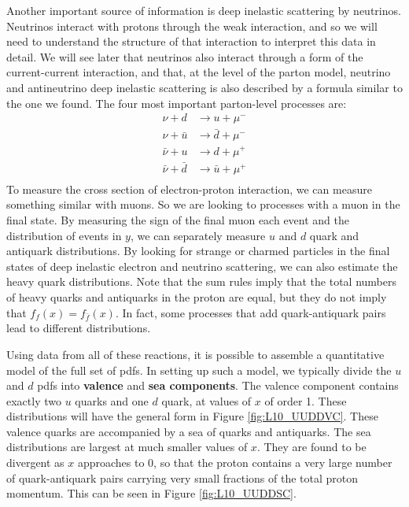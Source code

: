 \documentclass[../../main/main.tex]{subfiles}
\begin{document}
Another important source of information is deep inelastic scattering by neutrinos. Neutrinos interact with protons through the weak interaction, and so we will need to understand the structure of that interaction to interpret this data in detail. We will see later that neutrinos also interact through a form of the current-current interaction, and that, at the level of the parton model, neutrino and antineutrino deep inelastic scattering is also described by a formula similar to the one we found. The four most important parton-level processes are:
\begin{align}
	\nu + d 			&\longrightarrow u 		 + \mu^-	\\
	\nu + \bar{u}		&\longrightarrow \bar{d} + \mu^-	\\
	\bar{\nu} + u		&\longrightarrow d  	 + \mu^+	\\
	\bar{\nu} + \bar{d} &\longrightarrow \bar{u} + \mu^+	\\
\end{align}
To measure the cross section of electron-proton interaction, we can measure something similar with muons. So we are looking to processes with a muon in the final state. By measuring the sign of
the final muon each event and the distribution of events in \( y \), we can separately measure \( u \) and \( d \) quark and antiquark distributions. By looking for strange or charmed particles in the final states of deep inelastic electron and neutrino scattering, we can also estimate the heavy quark distributions. Note that the sum rules imply that the total numbers of heavy quarks and antiquarks in the proton are equal, but they do not imply that \( f_f(x) = f_{\bar{f}}(x) \). In fact, some processes that add quark-antiquark pairs lead to different distributions.

Using data from all of these reactions, it is possible to assemble a quantitative model of the full set of pdfs. In setting up such a model, we typically divide the \( u \) and \( d \) pdfs into \textbf{valence} and \textbf{sea components}. The valence component contains exactly two \( u \) quarks and one \( d \) quark, at values of \( x \) of order 1. These distributions will have the general form in Figure \ref{fig:L10_UUDDVC}. These valence quarks are accompanied by a sea of quarks and antiquarks. The sea distributions are largest at much smaller values of \( x \). They are found to be divergent as \( x \) approaches to 0, so that the proton contains a very large number of quark-antiquark pairs carrying very small fractions of the total proton momentum. This can be seen in Figure \ref{fig:L10_UUDDSC}.
\end{document}
